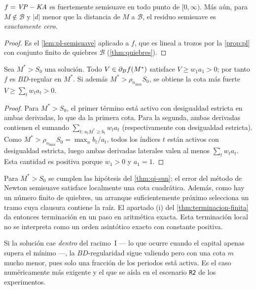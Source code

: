 \begin{theorem}
\label{thm:semisuavidad}
$f=\mathit{VP}-\mathit{KA}$ es fuertemente semisuave en todo punto de $[0,\infty)$. Más aún, para
$M\notin\mathcal{B}$ y $|d|$ menor que la distancia de $M$ a $\mathcal{B}$, el
residuo semisuave es \emph{exactamente cero}.
\end{theorem}
\begin{proof}
Es el \cref{lem:pl-semisuave} aplicado a $f$, que es lineal a trozos por la
\cref{prop:pl} con conjunto finito de quiebres $\mathcal{B}$ (\cref{thm:quiebres}).
\end{proof}

\begin{theorem}[$BD$-regularidad]
\label{thm:bd-regularidad}
Sea $M^*>S_0$ una solución. Todo $V\in\partial_B f(M^*)$ satisface
$V\ge w_1a_1>0$; por tanto $f$ es $BD$-regular en $M^*$.
Si además $M^*>\rho_{n_{\max}}S_0$, se obtiene la cota más fuerte
$V\ge\sum_t w_ta_t>0$.
\end{theorem}
\begin{proof}
Para $M^*>S_0$, el primer término está activo con desigualdad estricta en ambas derivadas, lo que da la primera cota. Para la segunda, ambas derivadas contienen el sumando
$\sum_{t:\,a_tM^*\ge b_t}w_ta_t$ (respectivamente con desigualdad estricta). Como
$M^*>\rho_{n_{\max}}S_0=\max_n b_t/a_t$, todos los índices $t$ están activos con
desigualdad estricta, luego ambas derivadas laterales valen al menos
$\sum_tw_ta_t$. Esta cantidad es positiva porque $w_1>0$ y $a_1=1$.
\end{proof}

\begin{corollary}
\label{cor:qi-sun-aplica}
Para $M^*>S_0$ se cumplen las hipótesis del \cref{thm:qi-sun}; el error
del método de Newton semisuave satisface localmente una cota cuadrática.
Además, como hay un número finito de quiebres, un arranque suficientemente
próximo selecciona un tramo cuya clausura contiene la raíz. El apartado (i)
del \cref{thm:terminacion-finita} da entonces terminación en un paso en
aritmética exacta. Esta terminación local no se interpreta como un orden
asintótico exacto con constante positiva.
\end{corollary}

\begin{remark}
Si la solución cae \emph{dentro} del racimo~I --- lo que ocurre cuando el capital
apenas supera el mínimo ---, la $BD$-regularidad sigue valiendo pero con una cota
$m$ mucho menor, pues solo una fracción de los periodos está activa. Es el caso
numéricamente más exigente y el que se aísla en el escenario \texttt{R2} de los
experimentos.
\end{remark}


